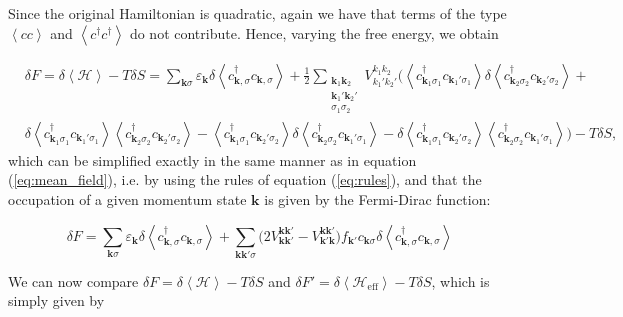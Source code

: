 Since the original Hamiltonian is quadratic, again we have that terms of the type $\left\langle cc \right\rangle$ and $\left\langle c^\dagger c^\dagger \right\rangle$ do not contribute. Hence, varying the free energy, we obtain

\begin{equation}
\begin{split}
&\delta F =  \delta \left\langle \mathcal{H} \right\rangle - T \delta S = \sum_{\bm k \sigma} \varepsilon_{\bm k} \delta \left\langle c_{\bm k, \sigma}^\dagger c_{\bm k, \sigma} \right\rangle + \frac{1}{2} \sum_{\substack{\bm k_1 \bm k_2 \\ \bm k_1' \bm k_2' \\  \sigma_1 \sigma_2}} V_{k_1' k_2'}^{k_1 k_2} \bigg( \left\langle c_{\bm k_1 \sigma_1}^\dagger c_{\bm k_1' \sigma_1} \right\rangle \delta  \left\langle c_{\bm k_2 \sigma_2}^\dagger c_{\bm k_2' \sigma_2} \right\rangle + \\
&\delta \left\langle c_{\bm k_1 \sigma_1}^\dagger c_{\bm k_1' \sigma_1} \right\rangle  \left\langle c_{\bm k_2 \sigma_2}^\dagger c_{\bm k_2' \sigma_2} \right\rangle  - \left\langle c_{\bm k_1 \sigma_1}^\dagger c_{\bm k_2' \sigma_2} \right\rangle  \delta \left\langle c_{\bm k_2 \sigma_2}^\dagger c_{\bm k_1' \sigma_1} \right\rangle - \delta \left\langle c_{\bm k_1 \sigma_1}^\dagger c_{\bm k_2' \sigma_2} \right\rangle  \left\langle c_{\bm k_2 \sigma_2}^\dagger c_{\bm k_1' \sigma_1} \right\rangle \bigg) - T \delta S ,
\end{split}
\end{equation}
which can be simplified exactly in the same manner as in equation (\ref{eq:mean_field}), i.e. by using the rules of equation (\ref{eq:rules}), and that the occupation of a given momentum state $\bm k$ is given by the Fermi-Dirac function:

\begin{equation}
\delta F = \sum_{\bm k \sigma} \varepsilon_{\bm k} \delta \left\langle c_{\bm k, \sigma}^\dagger c_{\bm k, \sigma} \right\rangle + \sum_{\bm k \bm k' \sigma} \bigg( 2 V_{\bm k \bm k'}^{\bm k \bm k'} -  V_{\bm k' \bm k}^{\bm k \bm k'}  \bigg) f_{\bm k'} c_{\bm k \sigma} \delta \left\langle c_{\bm k, \sigma}^\dagger c_{\bm k, \sigma} \right\rangle
\end{equation}

We can now compare $\delta F = \delta \left\langle \mathcal{H} \right\rangle - T \delta S$ and $\delta F' = \delta \left\langle \mathcal{H}_{\text{eff}} \right\rangle - T \delta S$, which is simply given by


